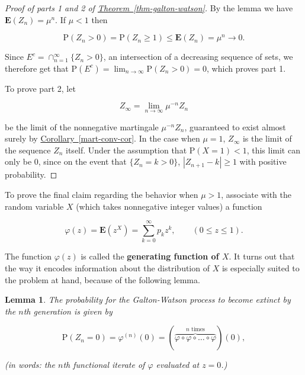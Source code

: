 \documentclass[11pt]{report}
\theoremstyle{plain}
\newtheorem{lem}[thm]{Lemma}
\theoremstyle{definition}
\begin{document}
\begin{proof}[Proof of parts 1 and 2 of \texorpdfstring{\hyperref[thm-galton-watson]{Theorem~\ref*{thm-galton-watson}}}{Theorem}]
By the lemma we have $\mathbf{E}(Z_n)=\mu^n$. If
$\mu<1$ then

\[
\mathrm{P}(Z_n>0)=\mathrm{P}(Z_n\ge 1)\le \mathbf{E}(Z_n) = \mu^n \to 0.
\]

\noindent Since $E^c = \cap_{n=1}^\infty \{ Z_n>0 \}$, an
intersection of a decreasing sequence of sets, we
therefore get that
$\mathrm{P}(E^c)=\displaystyle\lim_{n\to\infty}
\mathrm{P}(Z_n>0)=0$,
which proves part 1.

To prove part 2, let

\[
Z_\infty = \lim_{n\to\infty} \mu^{-n} Z_n
\]

\noindent be the limit of the nonnegative martingale
$\mu^{-n} Z_n$, guaranteed to exist almost surely by
\hyperref[mart-conv-cor]{Corollary~\ref*{mart-conv-cor}}. In the case when $\mu=1$,
$Z_\infty$ is the limit of the sequence $Z_n$ itself.
Under the assumption that $\mathrm{P}(X=1)<1$, this
limit can only be $0$, since on the event that
$\{Z_n=k>0\}$, $|Z_{n+1}-k|\ge 1$ with positive
probability.
\end{proof}

\noindent To prove the final claim regarding the behavior when
$\mu>1$, associate with the random variable $X$
(which takes nonnegative integer values) a function

\[
\varphi(z) = \mathbf{E}(z^X) = \sum_{k=0}^\infty p_k z^k, \qquad (0\le z\le 1).
\]

\noindent The function $\varphi(z)$ is called the \textbf{generating
function of $X$}. It turns out that the way it
encodes information about the distribution of $X$ is
especially suited to the problem at hand, because of
the following lemma.

\begin{lem}
The probability for the Galton-Watson process to
become extinct by the $n$th generation is given by

\[
\mathrm{P}(Z_n = 0) = \varphi^{(n)}(0) = (\overbrace{\varphi\circ \varphi\circ \ldots \circ \varphi}^{\textrm{$n$ times}})(0),
\]

\noindent (in words: the $n$th functional iterate of $\varphi$
evaluated at $z=0$.)
\end{lem}
\end{document}
